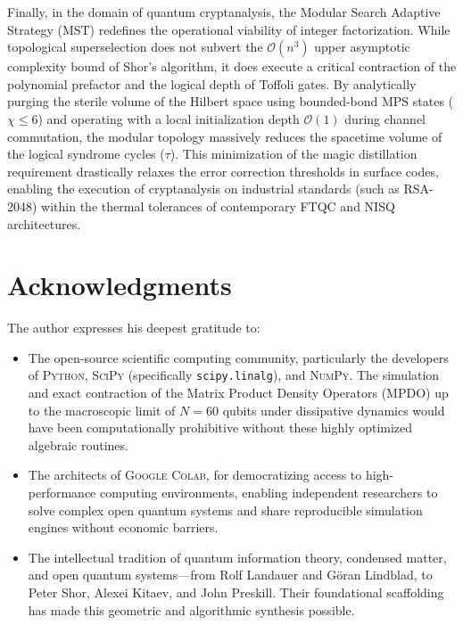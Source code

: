 \documentclass[12pt,a4paper]{article}
\theoremstyle{plain}
\theoremstyle{definition}
\theoremstyle{remark}
\begin{document}
Finally, in the domain of quantum cryptanalysis, the Modular Search Adaptive Strategy (MST) redefines the operational viability of integer factorization. While topological superselection does not subvert the $\mathcal{O}(n^3)$ upper asymptotic complexity bound of Shor's algorithm, it does execute a critical contraction of the polynomial prefactor and the logical depth of Toffoli gates. By analytically purging the sterile volume of the Hilbert space using bounded-bond MPS states ($\chi \le 6$) and operating with a local initialization depth $\mathcal{O}(1)$ during channel commutation, the modular topology massively reduces the spacetime volume of the logical syndrome cycles ($\tau$). This minimization of the magic distillation requirement drastically relaxes the error correction thresholds in surface codes, enabling the execution of cryptanalysis on industrial standards (such as RSA-2048) within the thermal tolerances of contemporary FTQC and NISQ architectures.

\section*{Acknowledgments}
The author expresses his deepest gratitude to:

\begin{itemize}
    \item The open-source scientific computing community, particularly the developers of \textsc{Python}, \textsc{SciPy} (specifically \texttt{scipy.linalg}), and \textsc{NumPy}. The simulation and exact contraction of the Matrix Product Density Operators (MPDO) up to the macroscopic limit of $N=60$ qubits under dissipative dynamics would have been computationally prohibitive without these highly optimized algebraic routines.
    \item The architects of \textsc{Google Colab}, for democratizing access to high-performance computing environments, enabling independent researchers to solve complex open quantum systems and share reproducible simulation engines without economic barriers.
    \item The intellectual tradition of quantum information theory, condensed matter, and open quantum systems—from Rolf Landauer and Göran Lindblad, to Peter Shor, Alexei Kitaev, and John Preskill. Their foundational scaffolding has made this geometric and algorithmic synthesis possible.
\end{itemize}
\end{document}
